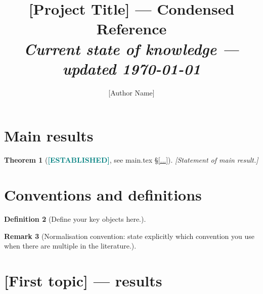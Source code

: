 \documentclass[11pt, a4paper]{article}
\title{[Project Title] — Condensed Reference\\
{\normalsize\textit{Current state of knowledge — updated \today}}}
\author{[Author Name]}
\date{}
\newcommand{\established}{\textcolor{teal}{\textbf{[ESTABLISHED]}}}
\theoremstyle{plain}
\newtheorem{theorem}{Theorem}[section]
\theoremstyle{definition}
\newtheorem{definition}[theorem]{Definition}
\newtheorem{remark}[theorem]{Remark}
\begin{document}
\maketitle

\tableofcontents
\newpage

\section{Main results}
\label{sec:mainresults}


\begin{theorem}[\established, see main.tex \S\ref{...}]
[Statement of main result.]
\end{theorem}

\section{Conventions and definitions}
\label{sec:conventions}


\begin{definition}
[Define your key objects here.]
\end{definition}

\begin{remark}
[Normalisation convention: state explicitly which convention you use when
there are multiple in the literature.]
\end{remark}

\section{[First topic] — results}
\label{sec:topic1results}

\end{document}
